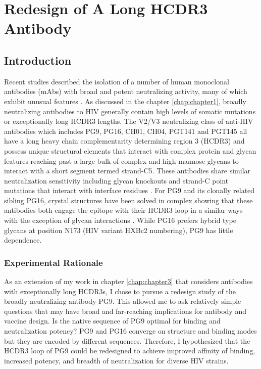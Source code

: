 \chapter{Redesign of A Long HCDR3 Antibody}
\label{chap:chapter4}
\section{Introduction}
Recent studies described the isolation of a number of human monoclonal antibodies (mAbs) with broad and potent neutralizing activity, many of which exhibit unusual features \citep{Bonsignori:2011dq,McLellan:2011dg,Walker:2009cd,Walker:2011ew}. As discussed in the chapter \ref{chap:chapter1}, broadly neutralizing antibodies to HIV generally contain high levels of somatic mutations or exceptionally long HCDR3 lengths. The V2/V3 neutralizing class of anti-HIV antibodies which includes PG9, PG16, CH01, CH04, PGT141 and PGT145 all have a long heavy chain complementarity determining region 3 (HCDR3) and possess unique structural elements that interact with complex protein and glycan features reaching past a large bulk of complex and high mannose glycans to interact with a short segment termed strand-C5. These antibodies share similar neutralization sensitivity including glycan knockouts and strand-C point mutations that interact with interface residues \citep{DoriaRose:2012if,Doores:2010gn}.  For PG9 and its clonally related sibling PG16, crystal structures have been solved in complex showing that these antibodies both engage the epitope with their HCDR3 loop in a similar ways with the exception of glycan interactions \citep{Pancera:2013ev}. While PG16 prefers hybrid type glycans at position N173 (HIV variant HXBc2 numbering), PG9 has little dependence.

\subsection{Experimental Rationale}
As an extension of my work in chapter \ref{chap:chapter3} that considers antibodies with exceptionally long HCDR3s, I chose to pursue a redesign study of the broadly neutralizing antibody PG9. This allowed me to ask relatively simple questions that may have broad and far-reaching implications for antibody and vaccine design. Is the native sequence of PG9 optimal for binding and neutralization potency? PG9 and PG16 converge on structure and binding modes but they are encoded by different sequences. Therefore, I hypothesized that the HCDR3 loop of PG9 could be redesigned to achieve improved affinity of binding, increased potency, and breadth of neutralization for diverse HIV strains.

